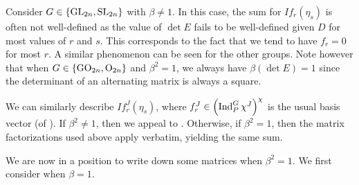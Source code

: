 \begin{remark} \label{rem:det-e-well-defined}
	Consider $G\in\{\mathrm{GL}_{2n},\mathrm{SL}_{2n}\}$ with $\beta\ne1$. In this case, the sum for $If_r(\eta_s)$ is often not well-defined as the value of $\det E$ fails to be well-defined given $D$ for most values of $r$ and $s$. This corresponds to the fact that we tend to have $f_r=0$ for most $r$. A similar phenomenon can be seen for the other groups. Note however that when $G\in\{\mathrm{GO}_{2n},\mathrm{O}_{2n}\}$ and $\beta^2=1$, we always have $\beta(\det E) = 1$ since the determinant of an alternating matrix is always a square.
\end{remark}
\begin{remark} \label{rem:i-on-fj}
	We can similarly describe $If_r^J(\eta_s)$, where $f_r^J\in\left(\operatorname{Ind}_P^G\chi^J\right)^{\chi}$ is the usual basis vector (of ). If $\beta^2\ne1$, then we appeal to . Otherwise, if $\beta^2=1$, then the matrix factorizations used above apply verbatim, yielding the same sum.
\end{remark}
We are now in a position to write down some matrices when $\beta^2=1$. We first consider when $\beta=1$.
